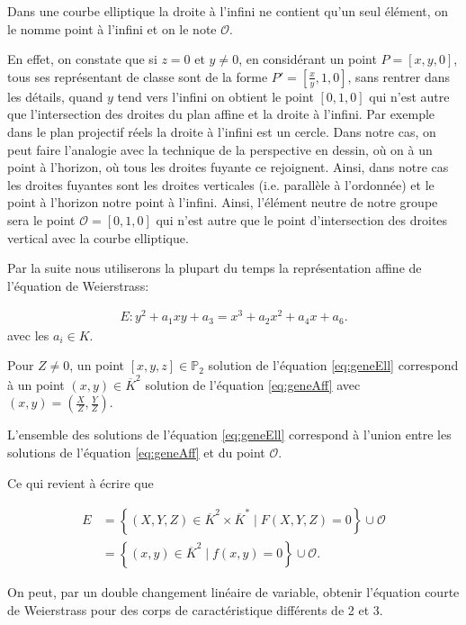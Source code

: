 

Dans une courbe elliptique la droite à l'infini ne contient qu'un seul élément, on le nomme
point à l'infini et on le note $\mathcal{O}$.

En effet, on constate
que si $z = 0$ et $y \neq 0$, en considérant un point $P=[x,y,0]$, tous ses représentant de
classe sont de la forme $P'=[\frac{x}{y},1,0]$, sans rentrer dans les détails, quand $y$ tend
vers l'infini on obtient le point $[0,1,0]$ qui n'est autre que l'intersection des droites du
plan affine et la droite à l'infini. Par exemple dans le plan projectif réels la droite à
l'infini est un cercle. Dans notre cas, on peut faire l'analogie avec la technique de
la perspective en dessin, où on à un point à l'horizon, où tous les droites fuyante ce rejoignent. Ainsi,
dans notre cas les droites fuyantes sont les droites verticales (i.e. parallèle à l'ordonnée) et le
point à l'horizon notre point à l'infini. Ainsi, l'élément neutre de notre groupe sera le point
$\mathcal{O} = [0,1,0]$ qui n'est autre que le point d'intersection des droites
vertical avec la courbe elliptique.

Par la suite nous utiliserons la plupart du temps la représentation affine de
l'équation de Weierstrass:

\begin{align}
    \label{eq:geneAff}
E : y^2 + a_1xy + a_3 = x^3 +a_2x^2+a_4x+a_6
.\end{align}
avec les $a_{i} \in K$. 

Pour $Z \neq 0$, un point $[x,y,z] \in \mathbb{P}_{2}$ solution de l'équation
\eqref{eq:geneEll} correspond à un point $(x,y) \in \overline{K}^2$ solution de
l'équation \eqref{eq:geneAff} avec $(x,y)=(\frac{X}{Z},\frac{Y}{Z})$.

L'ensemble des solutions de l'équation \eqref{eq:geneEll} correspond à l'union entre les
solutions de l'équation \eqref{eq:geneAff} et du point $\mathcal{O}$.

Ce qui revient à écrire que

\begin{align*}
    E &= \left\{ (X,Y,Z) \in \overline{K}^2 \times \overline{K}^{*} \mid F(X,Y,Z) = 0 \right\}  \cup
{\mathcal{O}} \\
&= \left\{ (x,y) \in \overline{K}^2 \mid f(x,y) = 0 \right\} \cup {\mathcal{O}}
.\end{align*}

On peut, par un double changement linéaire de variable, obtenir l'équation courte de Weierstrass
pour des corps de caractéristique différents de 2 et 3.

